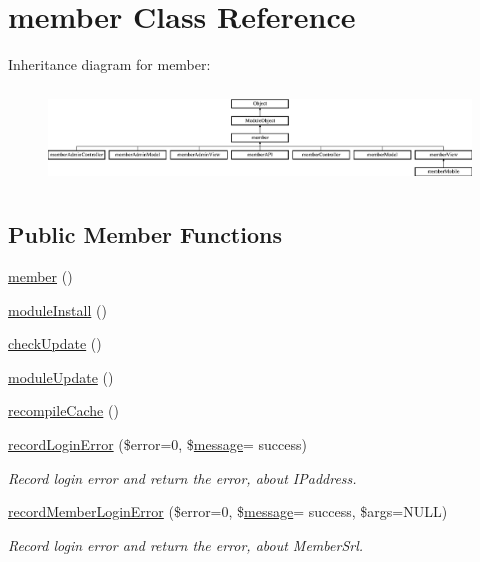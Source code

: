 \hypertarget{classmember}{}\section{member Class Reference}
\label{classmember}
Inheritance diagram for member\+:\begin{figure}[H]
\begin{center}
\leavevmode
\includegraphics[height=2.580645cm]{classmember}
\end{center}
\end{figure}
\subsection*{Public Member Functions}
\begin{DoxyCompactItemize}
\item 
\hyperlink{classmember_a4153f13605eac8adf8dde89ee7d18c02}{member} ()
\item 
\hyperlink{classmember_a5834fa338d03eedcb5e84bb8ccac305b}{module\+Install} ()
\item 
\hyperlink{classmember_ad28f96bfab17efa94a9f2607a8b42a3d}{check\+Update} ()
\item 
\hyperlink{classmember_a72b7382e568644ccadb69b67e4504086}{module\+Update} ()
\item 
\hyperlink{classmember_ab5bc32f3821f7cba98e34703679c69ee}{recompile\+Cache} ()
\item 
\hyperlink{classmember_a557d0a329f29c5490a53c6e5a58dcab9}{record\+Login\+Error} (\$error=0, \$\hyperlink{classmessage}{message}= \textquotesingle{}success\textquotesingle{})
\begin{DoxyCompactList}\small\item\em Record login error and return the error, about I\+Paddress. \end{DoxyCompactList}\item 
\hyperlink{classmember_a629cfb29393b629f0b39e4467a3d44d4}{record\+Member\+Login\+Error} (\$error=0, \$\hyperlink{classmessage}{message}= \textquotesingle{}success\textquotesingle{}, \$args=N\+U\+L\+L)
\begin{DoxyCompactList}\small\item\em Record login error and return the error, about Member\+Srl. \end{DoxyCompactList}\end{DoxyCompactItemize}

